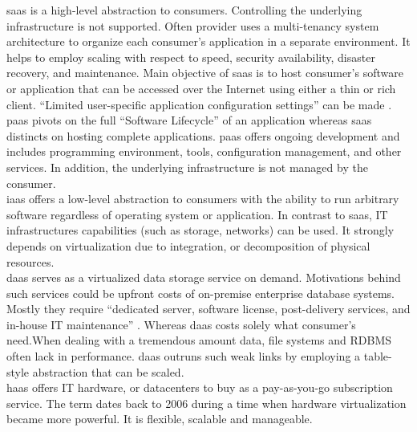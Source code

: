 \ac{saas} is a high-level abstraction to consumers. Controlling the underlying infrastructure is not supported. Often provider uses a multi-tenancy system architecture to organize each consumer's application in a separate environment. It helps to employ scaling with respect to speed, security availability, disaster recovery, and maintenance. Main objective of \ac{saas} is to host consumer's software or application that can be accessed over the Internet using either a thin or rich client.\cite{Dillon2010} \enquote{Limited user-specific application configuration settings} can be made \cite{Mell2011}.\\

\ac{paas} pivots on the full \enquote{Software Lifecycle} of an application whereas \ac{saas} distincts on hosting complete applications. \ac{paas} offers ongoing development and includes programming environment, tools, configuration management, and other services. In addition, the underlying infrastructure is not managed by the consumer.\\

\ac{iaas} offers a low-level abstraction to consumers with the ability to run arbitrary software regardless of operating system or application. In contrast to \ac{saas}, IT infrastructures capabilities (such as storage, networks) can be used. It strongly depends on virtualization due to integration, or decomposition of physical resources. \\

\ac{daas} serves as a virtualized data storage service on demand. Motivations behind such services could be upfront costs of on-premise enterprise database systems.\cite{Dillon2010} Mostly they require \enquote{dedicated server, software license, post-delivery services, and in-house IT maintenance} \cite{Dillon2010}. Whereas \ac{daas} costs solely what consumer's need.When dealing with a tremendous amount data, file systems and RDBMS often lack in performance. \ac{daas} outruns such weak links by employing a table-style abstraction that can be scaled. \\

\ac{haas} offers IT hardware, or datacenters to buy as a pay-as-you-go subscription service. The term dates back to 2006 during a time when hardware virtualization became more powerful. It is flexible, scalable and manageable. \cite{Wang2010}\\

